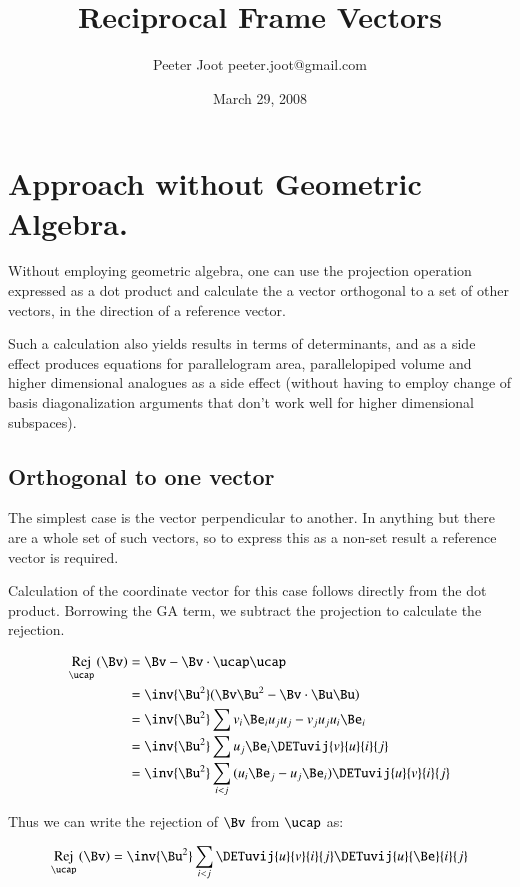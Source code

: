 \documentclass{article}      %
\title{ Reciprocal Frame Vectors } %
\author{Peeter Joot \quad peeter.joot@gmail.com}         %
\date{ March 29, 2008}        %
\DeclareMathOperator{\RejName}{Rej}
\newcommand{\Rej}[2]{\RejName_{#1}\left( {#2} \right)}
\begin{document}

\maketitle{}

\section{ Approach without Geometric Algebra. }

Without employing geometric algebra, one can use the projection
operation expressed as a dot product and calculate the a vector
orthogonal to a set of other vectors, in the direction of a reference
vector.

Such a calculation also yields  results in terms of determinants, and as a side
effect produces equations for
parallelogram area, parallelopiped volume and higher dimensional analogues as a side effect
(without having to employ change of basis diagonalization arguments that don't work well
for higher dimensional subspaces).

\subsection{ Orthogonal to one vector }

The simplest case is the vector perpendicular to another.  In anything
but  there are a whole set of such vectors, so to express this as a
non-set result a reference vector is required.

Calculation of the coordinate vector for this case follows directly from
the dot product.  Borrowing the GA term, we subtract the projection
to calculate the rejection.

\begin{align*}
\Rej{\ucap}{\Bv}
&= \Bv - \Bv \cdot \ucap \ucap \\
&= \inv{\Bu^2}(\Bv\Bu^2 - \Bv \cdot \Bu \Bu) \\
&= \inv{\Bu^2}\sum{v_i\Be_i u_j u_j - v_j u_j u_i \Be_i} \\
&= \inv{\Bu^2}\sum{u_j\Be_i\DETuvij{v}{u}{i}{j}} \\
&= \inv{\Bu^2}\sum_{i<j}{(u_i \Be_j -u_j\Be_i)\DETuvij{u}{v}{i}{j}} \\
\end{align*}

Thus we can write the rejection of $\Bv$ from $\ucap$ as:

\begin{equation}\label{eqn:rejonevector}
\Rej{\ucap}{\Bv} = \inv{\Bu^2}\sum_{i<j}\DETuvij{u}{v}{i}{j}\DETuvij{u}{\Be}{i}{j}
\end{equation}
\end{document}
